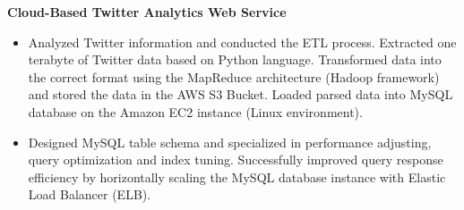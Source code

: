 {\raggedright\normalsize \textbf{Cloud-Based Twitter Analytics Web Service}} %

\begin{itemize}[leftmargin=*, topsep=1pt, partopsep=1.5pt]
\setlength\itemsep{1pt}
\item Analyzed Twitter information and conducted the ETL process. Extracted one terabyte of Twitter data based on Python language. Transformed data into the correct format using the MapReduce architecture (Hadoop framework) and stored the data in the AWS S3 Bucket. Loaded parsed data into MySQL database on the Amazon EC2 instance (Linux environment).
\item Designed MySQL table schema and specialized in performance adjusting, query optimization and index tuning. Successfully improved query response efficiency by horizontally scaling the MySQL database instance with Elastic Load Balancer (ELB).\\[0.01\baselineskip]
\end{itemize}

